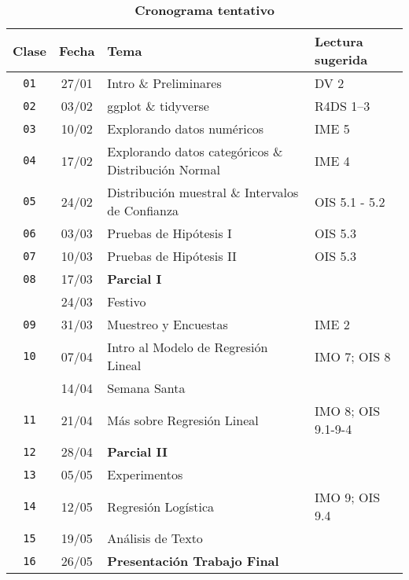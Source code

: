 \documentclass[10pt]{article}
\newcommand{\ra}[1]{\renewcommand{\arraystretch}{#1}}
\begin{document}
	\begin{table}[htb]
		\centering
		\caption*{\textbf{Cronograma tentativo}}
		\ra{1.5}
		\begin{tabular}{@{\extracolsep{1cm}} c c l l @{}}
			\toprule
			\textbf{Clase} & \textbf{Fecha} & \textbf{Tema} & \textbf{Lectura sugerida}  \\ \toprule
			\texttt{01} & 27/01 & Intro \& Preliminares & DV 2 \\
			\texttt{02} & 03/02 & ggplot \& tidyverse & R4DS 1--3 \\
			\texttt{03} & 10/02 & Explorando datos numéricos & IME 5 \\
			\texttt{04} & 17/02 & Explorando datos categóricos \& Distribución Normal & IME 4
			\\
			\texttt{05} & 24/02 & Distribución muestral \& Intervalos de Confianza & OIS 5.1 - 5.2 \\
			\texttt{06} & 03/03 & Pruebas de Hipótesis I & OIS 5.3 \\
			\texttt{07} & 10/03 & Pruebas de Hipótesis II & OIS 5.3 \\ \midrule
			\texttt{08} & 17/03 & \textbf{Parcial I} &   \\ \midrule
			& 24/03 & Festivo &   \\
			\texttt{09} & 31/03 & Muestreo y Encuestas & IME 2  \\
			\texttt{10} & 07/04 & Intro al Modelo de Regresión Lineal & IMO 7; OIS 8 \\ 
			& 14/04 & Semana Santa & \\ 
			\texttt{11} & 21/04 & Más sobre Regresión Lineal & IMO 8; OIS 9.1-9-4 \\ \midrule
			\texttt{12} & 28/04 & \textbf{Parcial II} &   \\ \midrule
			\texttt{13} & 05/05 & Experimentos &  \\
			\texttt{14} & 12/05 & Regresión Logística & IMO 9; OIS 9.4 \\
			\texttt{15} & 19/05 & Análisis de Texto &  \\
			\texttt{16} & 26/05 & \textbf{Presentación Trabajo Final} &   \\ 
			\bottomrule
		\end{tabular}
	\end{table}
	
	
\end{document}
